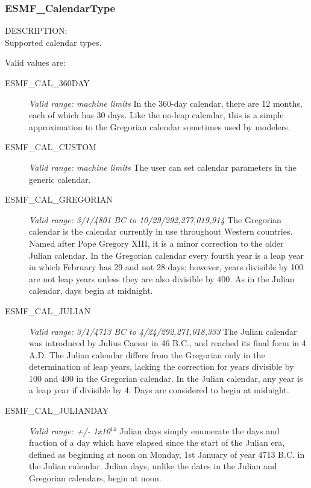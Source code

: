 
\label{subsec:Calendar_options}
\subsubsection{ESMF\_CalendarType}

{\sf DESCRIPTION:\\}
Supported calendar types.

Valid values are:
\begin{description}
      
\item [ESMF\_CAL\_360DAY] 
{\it Valid range: machine limits} 
\newline In the 360-day calendar, there are 12 months, each of which has 30 days.  
Like the no-leap calendar, this is a simple approximation to the Gregorian
calendar sometimes used by modelers.

\item [ESMF\_CAL\_CUSTOM] 
{\it Valid range: machine limits} 
\newline The user can set calendar parameters in the generic calendar.

\item [ESMF\_CAL\_GREGORIAN] 
{\it Valid range: 3/1/4801 BC to 10/29/292,277,019,914 }
\newline The Gregorian calendar is the calendar currently in use 
throughout Western countries.  Named after Pope Gregory XIII, it is a minor 
correction to the older Julian calendar. In the Gregorian calendar every
fourth year is a leap year in which February has 29 and not 28 days;
however, years divisible by 100 are not leap years unless they are also 
divisible  by 400.  As in the Julian calendar, days begin at midnight.

\item [ESMF\_CAL\_JULIAN]
{\it Valid range: 3/1/4713 BC to 4/24/292,271,018,333 } 
\newline The Julian calendar was introduced by Julius Caesar in 46 B.C., and 
reached its final form in 4 A.D.  The Julian calendar differs from the 
Gregorian only in the determination of leap years, lacking the correction 
for years divisible by 100 and 400 in the Gregorian calendar.  In the Julian 
calendar, any year is a leap year if divisible by 4.  Days are considered to 
begin at midnight.

\item [ESMF\_CAL\_JULIANDAY] 
{\it Valid range:  +/- 1x10$^{14}$} 
\newline Julian days simply enumerate the days and fraction of a day which 
have elapsed since the start of the Julian era, defined as beginning at noon 
on Monday, 1st January of year 4713 B.C. in the Julian calendar.  Julian days, 
unlike the dates in the Julian and Gregorian calendars, begin at noon.


\end{description}
